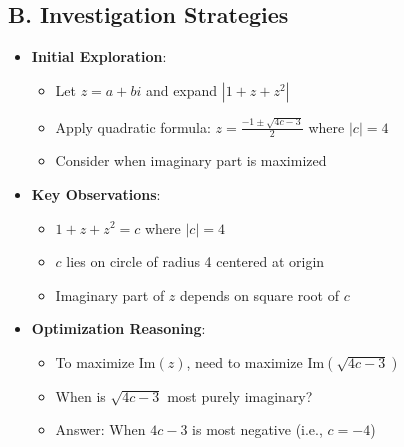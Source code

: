 \documentclass[11pt]{article}
\begin{document}
\begin{strategybox}
\subsection*{B. Investigation Strategies}
\begin{itemize}[leftmargin=*]
    \item \textbf{Initial Exploration}:
    \begin{itemize}
        \item Let $z = a + bi$ and expand $|1+z+z^2|$
        \item Apply quadratic formula: $z = \frac{-1 \pm \sqrt{4c-3}}{2}$ where $|c| = 4$
        \item Consider when imaginary part is maximized
    \end{itemize}
    \item \textbf{Key Observations}:
    \begin{itemize}
        \item $1+z+z^2 = c$ where $|c| = 4$
        \item $c$ lies on circle of radius 4 centered at origin
        \item Imaginary part of $z$ depends on square root of $c$
    \end{itemize}
    \item \textbf{Optimization Reasoning}:
    \begin{itemize}
        \item To maximize $\text{Im}(z)$, need to maximize $\text{Im}(\sqrt{4c-3})$
        \item When is $\sqrt{4c-3}$ most purely imaginary?
        \item Answer: When $4c-3$ is most negative (i.e., $c = -4$)
    \end{itemize}
\end{itemize}


\end{strategybox}
\end{document}
